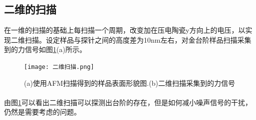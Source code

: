 \subsection{二维的扫描}
在一维的扫描的基础上每扫描一个周期，改变加在压电陶瓷y方向上的电压，以实现二维扫描。设定样品与探针之间的高度差为10nm左右，对金台阶样品扫描采集到的力信号如图\ref{fig:17}(a)所示。
\begin{figure}[h]
	\centering
	\texttt{[image: 二维扫描.png]}
	\caption{(a)使用AFM扫描得到的样品表面形貌图.(b)二维扫描采集到的力信号}
	\label{fig:17}
\end{figure}
\paragraph*{}
由图\ref{fig:17}可以看出二维扫描可以探测出台阶的存在，但是如何减小噪声信号的干扰，仍然是需要考虑的问题。